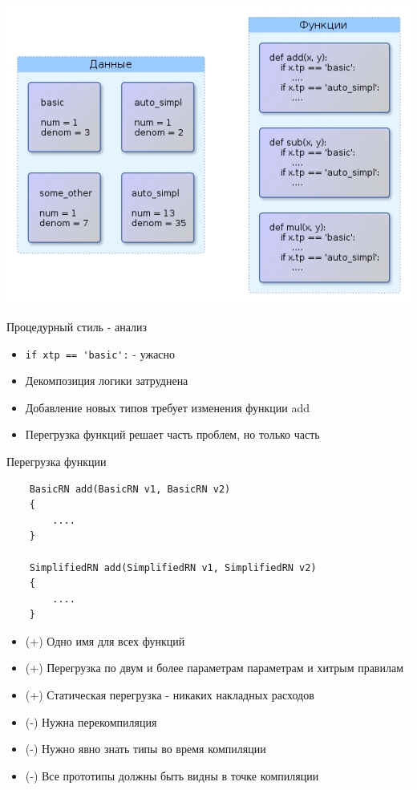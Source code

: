 \documentclass{article}
\begin{document}
\begin{center} \includegraphics{images/procedural_style.jpg} \end{center} 
\newpage

\begin{center} Процедурный стиль - анализ \end{center}
\begin{itemize}
    \item \lstinline!if xtp == 'basic':! - ужасно
    \item Декомпозиция логики затруднена
    \item Добавление новых типов требует изменения функции add
    \item Перегрузка функций решает часть проблем, но только часть
\end{itemize}
\newpage
\begin{center} Перегрузка функции \end{center}
\lstset{language=C++}
\begin{lstlisting}
    BasicRN add(BasicRN v1, BasicRN v2)
    {
        ....
    }

    SimplifiedRN add(SimplifiedRN v1, SimplifiedRN v2)
    {
        ....
    }
\end{lstlisting}
\lstset{language=python}
\newpage

\begin{itemize}
    \item (+) Одно имя для всех функций
    \item (+) Перегрузка по двум и более параметрам параметрам и хитрым правилам
    \item (+) Статическая перегрузка - никаких накладных расходов
    \item (-) Нужна перекомпиляция
    \item (-) Нужно явно знать типы во время компиляции
    \item (-) Все прототипы должны быть видны в точке компиляции
\end{itemize}
\newpage
\end{document}
